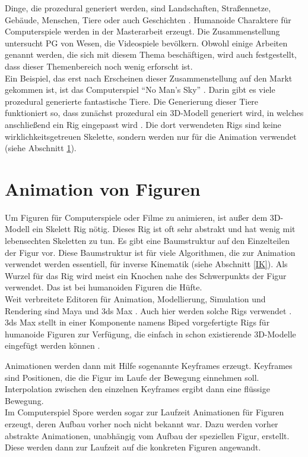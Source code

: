 Dinge, die prozedural generiert werden, sind Landschaften, Straßennetze, Gebäude, Menschen, Tiere oder auch Geschichten \cite{PCGSurvey}. Humanoide Charaktere für Computerspiele werden \zb in der Masterarbeit \cite{ProceduralCharacterGeneration} erzeugt. Die Zusammenstellung \cite{PCGSurvey_videoGames} untersucht PG von Wesen, die Videospiele bevölkern. Obwohl einige Arbeiten genannt werden, die sich mit diesem Thema beschäftigen, wird auch festgestellt, dass dieser Themenbereich noch wenig erforscht ist. \\
Ein Beispiel, das erst nach Erscheinen dieser Zusammenstellung auf den Markt gekommen ist, ist das Computerspiel "`No Man's Sky"' \cite{NoMansSky}. Darin gibt es viele prozedural generierte fantastische Tiere. Die Generierung dieser Tiere funktioniert so, dass zunächst prozedural ein 3D-Modell generiert wird, in welches anschließend ein Rig eingepasst wird \cite{NoMansSkyDevelopment}.
Die dort verwendeten Rigs sind keine wirklichkeitsgetreuen Skelette, sondern werden nur für die Animation verwendet (siehe Abschnitt \ref{character_animation}).



\section{Animation von Figuren}
\label{character_animation}

Um Figuren für Computerspiele oder Filme zu animieren, ist außer dem 3D-Modell ein Skelett \bzw Rig nötig. Dieses Rig ist oft sehr abstrakt und hat wenig mit lebensechten Skeletten zu tun. Es gibt eine Baumstruktur auf den Einzelteilen der Figur vor. Diese Baumstruktur ist für viele Algorithmen, die zur Animation verwendet werden essentiell, \zb für inverse Kinematik (siehe Abschnitt \ref{IK}). Als Wurzel für das Rig wird meist ein Knochen nahe des Schwerpunkts der Figur verwendet. Das ist bei humanoiden Figuren die Hüfte.\\
Weit verbreitete Editoren für Animation, Modellierung, Simulation und Rendering sind Maya \cite{Maya} und 3ds Max \cite{3dsMax}. Auch hier werden solche Rigs verwendet \cite{MayaSkeletonHierarchy}. 3ds Max stellt \zb in einer Komponente namens Biped vorgefertigte Rigs für humanoide Figuren zur Verfügung, die einfach in schon existierende 3D-Modelle eingefügt werden können \cite{3dsMaxBiped}.

Animationen werden dann mit Hilfe sogenannte Keyframes erzeugt. Keyframes sind Positionen, die die Figur im Laufe der Bewegung einnehmen soll. Interpolation zwischen den einzelnen Keyframes ergibt dann eine flüssige Bewegung. \cite[Kapitel 3]{sporeanim}\\
Im Computerspiel Spore \cite{Spore} werden sogar zur Laufzeit Animationen für Figuren erzeugt, deren Aufbau vorher noch nicht bekannt war. Dazu werden vorher abstrakte Animationen, unabhängig vom Aufbau der speziellen Figur, erstellt. Diese werden dann zur Laufzeit auf die konkreten Figuren angewandt. \cite{sporeanim}

